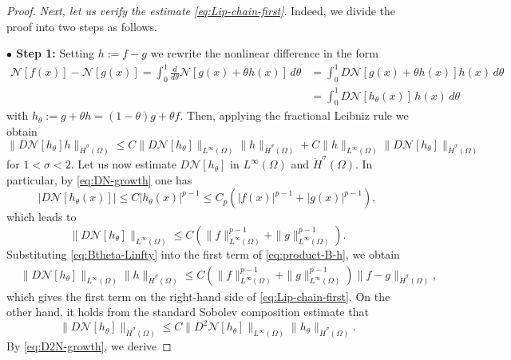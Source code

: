\documentclass[10pt,a4paper]{amsart}
\numberwithin{equation}{section}
\begin{document}
\begin{proof}
\textit{Next, let us verify the estimate \eqref{eq:Lip-chain-first}}. Indeed, we divide the proof into two steps as follows. \medskip

\noindent\textbf{$\bullet$ Step 1:} Setting $h:=f-g$ we rewrite the nonlinear difference in the form
\begin{align*}
\mathcal{N}[f(x)]-\mathcal{N}[g(x)]
=
\int_0^1
\frac{d}{d\theta}
\mathcal{N}[g(x)+\theta h(x)]
\,d\theta
&=
\int_0^1
D\mathcal{N}[g(x)+\theta h(x)]
h(x)\,d\theta \\
&= \int_0^1 D\mathcal{N}[h_\theta(x)]\, h(x)\,d\theta
\end{align*}
with $
h_\theta:=g+\theta h=(1-\theta)g+\theta f$. Then, applying the fractional Leibniz rule we obtain
\begin{equation}
\label{eq:product-B-h}
\big\|D\mathcal{N}[h_\theta] h\big\|_{\dot H^\sigma(\Omega)}
\le
C\big\|D\mathcal{N}[h_\theta]\big\|_{L^\infty(\Omega)}
\|h\|_{\dot H^\sigma(\Omega)}
+
C\|h\|_{L^\infty(\Omega)}
\big\|D\mathcal{N}[h_\theta]\big\|_{\dot H^\sigma(\Omega)}
\end{equation}
for \(1<\sigma<2\). Let us now estimate \(D\mathcal{N}[h_\theta]\) in \(L^\infty(\Omega)\) and \(\dot H^\sigma(\Omega)\). In particular, by \eqref{eq:DN-growth} one has
\[
\big|D\mathcal{N}[h_\theta(x)]\big|
\le
C|h_\theta(x)|^{p-1}
\le
C_p
\left(
|f(x)|^{p-1}+|g(x)|^{p-1}
\right),
\]
which leads to
\begin{equation}
\label{eq:Btheta-Linfty}
\big\|D\mathcal{N}[h_\theta]\big\|_{L^\infty(\Omega)}
\le
C
\left(
\|f\|_{L^\infty(\Omega)}^{p-1}
+
\|g\|_{L^\infty(\Omega)}^{p-1}
\right).
\end{equation}
Substituting \eqref{eq:Btheta-Linfty} into the first term of
\eqref{eq:product-B-h}, we obtain
\begin{align}
&\big\|D\mathcal{N}[h_\theta]\big\|_{L^\infty(\Omega)}
\|h\|_{\dot H^\sigma(\Omega)} \le
C
\left(
\|f\|_{L^\infty(\Omega)}^{p-1}
+
\|g\|_{L^\infty(\Omega)}^{p-1}
\right)
\|f-g\|_{\dot H^\sigma(\Omega)},
\label{eq:first-product-term}
\end{align}
which gives the first term on the right-hand side of
\eqref{eq:Lip-chain-first}. On the other hand, it holds from the standard Sobolev composition estimate that
\begin{equation}
\label{eq:composition-DN}
\big\|D\mathcal{N}[h_\theta]\big\|_{\dot H^\sigma(\Omega)}
\le
C
\big\|D^2\mathcal{N}[h_\theta]\big\|_{L^\infty(\Omega)}
\|h_\theta\|_{\dot H^\sigma(\Omega)}.
\end{equation}
By \eqref{eq:D2N-growth}, we derive

\end{proof}
\end{document}
